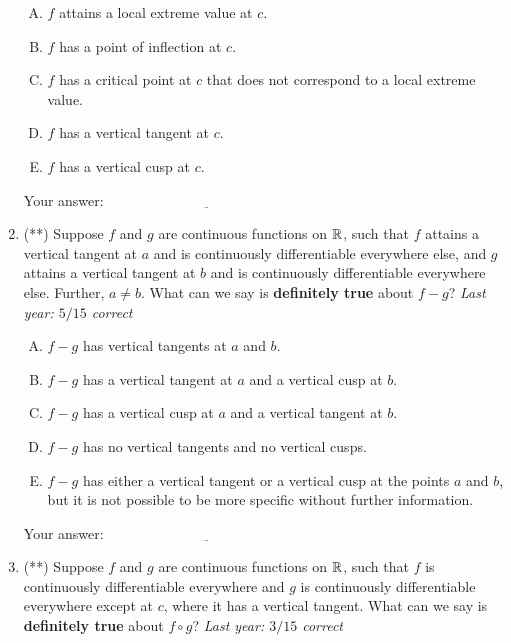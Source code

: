 \documentclass[10pt]{amsart}
\begin{document}
\begin{enumerate}
  \begin{enumerate}[(A)]
  \item $f$ attains a local extreme value at $c$.
  \item $f$ has a point of inflection at $c$.
  \item $f$ has a critical point at $c$ that does not correspond to a
    local extreme value.
  \item $f$ has a vertical tangent at $c$.
  \item $f$ has a vertical cusp at $c$.
  \end{enumerate}

  \vspace{0.1in}
  Your answer: $\underline{\qquad\qquad\qquad\qquad\qquad\qquad\qquad}$
  \vspace{0.6in}

\item (**) Suppose $f$ and $g$ are continuous functions on $\mathbb{R}$, such
  that $f$ attains a vertical tangent at $a$ and is continuously
  differentiable everywhere else, and $g$ attains a vertical tangent
  at $b$ and is continuously differentiable everywhere else. Further,
  $a \ne b$. What can we say is {\bf definitely true} about $f - g$?
  {\em Last year: $5/15$ correct}

  \begin{enumerate}[(A)]
  \item $f - g$ has vertical tangents at $a$ and $b$.
  \item $f - g$ has a vertical tangent at $a$ and a vertical cusp at $b$.
  \item $f - g$ has a vertical cusp at $a$ and a vertical tangent at $b$.
  \item $f - g$ has no vertical tangents and no vertical cusps.
  \item $f - g$ has either a vertical tangent or a vertical cusp at
    the points $a$ and $b$, but it is not possible to be more specific
    without further information.
  \end{enumerate}

  \vspace{0.1in}
  Your answer: $\underline{\qquad\qquad\qquad\qquad\qquad\qquad\qquad}$
  \vspace{0.6in}

\item (**) Suppose $f$ and $g$ are continuous functions on $\mathbb{R}$, such that
  $f$ is continuously differentiable everywhere and $g$ is
  continuously differentiable everywhere except at $c$, where it has a
  vertical tangent. What can we say is {\bf definitely true} about $f
  \circ g$? {\em Last year: $3/15$ correct}


\end{enumerate}
\end{document}
